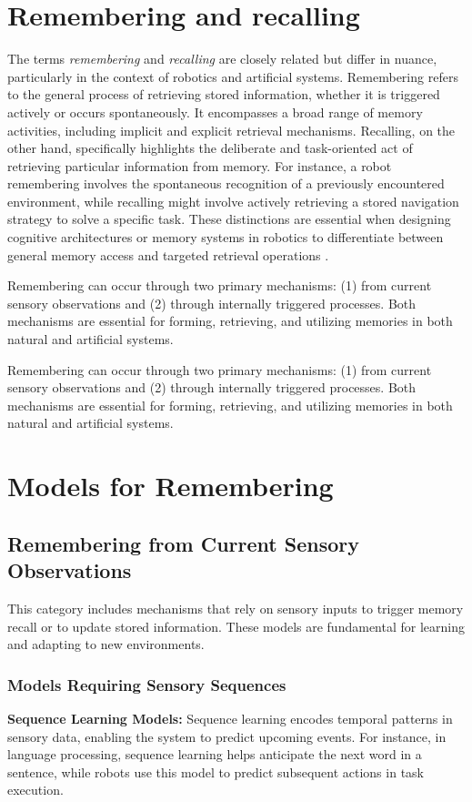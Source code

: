 \section{Remembering and recalling}
    The terms \textit{remembering} and \textit{recalling} are closely related but differ in nuance, particularly in the context of robotics and artificial systems. Remembering refers to the general process of retrieving stored information, whether it is triggered actively or occurs spontaneously. It encompasses a broad range of memory activities, including implicit and explicit retrieval mechanisms. Recalling, on the other hand, specifically highlights the deliberate and task-oriented act of retrieving particular information from memory. For instance, a robot remembering involves the spontaneous recognition of a previously encountered environment, while recalling might involve actively retrieving a stored navigation strategy to solve a specific task. These distinctions are essential when designing cognitive architectures or memory systems in robotics to differentiate between general memory access and targeted retrieval operations \cite{hebb-1949-organization-of-behavior, tulving-1985-elements-of-episodic-memory}.

    Remembering can occur through two primary mechanisms: (1) from current sensory observations and (2) through internally triggered processes. Both mechanisms are essential for forming, retrieving, and utilizing memories in both natural and artificial systems.
    
    Remembering can occur through two primary mechanisms: (1) from current sensory observations and (2) through internally triggered processes. Both mechanisms are essential for forming, retrieving, and utilizing memories in both natural and artificial systems.

\section{Models for Remembering}

    \subsection{Remembering from Current Sensory Observations}
    This category includes mechanisms that rely on sensory inputs to trigger memory recall or to update stored information. These models are fundamental for learning and adapting to new environments.

        \subsubsection{Models Requiring Sensory Sequences}
            \textbf{Sequence Learning Models:} Sequence learning encodes temporal patterns in sensory data, enabling the system to predict upcoming events. For instance, in language processing, sequence learning helps anticipate the next word in a sentence, while robots use this model to predict subsequent actions in task execution. \cite{hochreiter-1997-long-short-term-memory}

